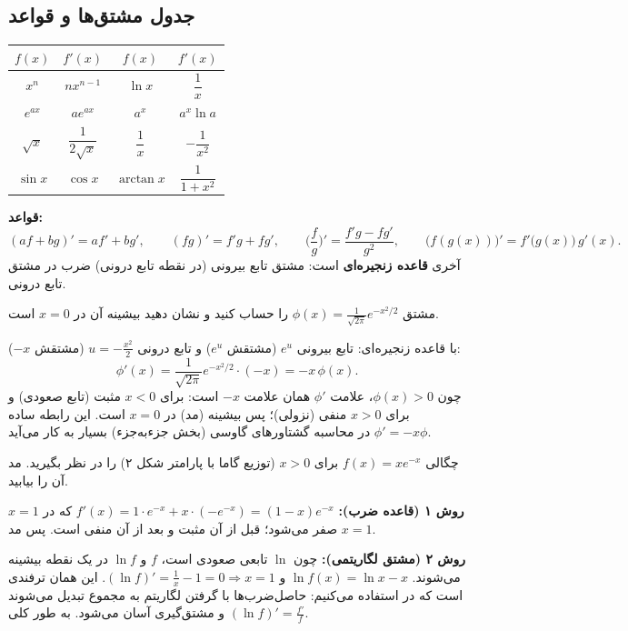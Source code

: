 \subsection{جدول مشتق‌ها و قواعد}
\begin{center}
\renewcommand{\arraystretch}{1.55}
\begin{tabular}{c|c||c|c}
$f(x)$ & $f'(x)$ & $f(x)$ & $f'(x)$\\\hline
$x^n$ & $nx^{n-1}$ & $\ln x$ & $\dfrac1x$\\
$e^{ax}$ & $ae^{ax}$ & $a^x$ & $a^x\ln a$\\
$\sqrt x$ & $\dfrac{1}{2\sqrt x}$ & $\dfrac1x$ & $-\dfrac1{x^2}$\\
$\sin x$ & $\cos x$ & $\arctan x$ & $\dfrac1{1+x^2}$
\end{tabular}
\end{center}
\textbf{قواعد:}
\[
(af+bg)'=af'+bg',\qquad (fg)'=f'g+fg',\qquad \Big(\frac fg\Big)'=\frac{f'g-fg'}{g^2},\qquad \big(f(g(x))\big)'=f'\big(g(x)\big)\,g'(x).
\]
آخری \textbf{قاعده زنجیره‌ای} است: مشتق تابع بیرونی (در نقطه تابع درونی) ضرب در مشتق تابع درونی.

\begin{example}
مشتق $\phi(x)=\frac{1}{\sqrt{2\pi}}e^{-x^2/2}$ را حساب کنید و نشان دهید بیشینه آن در $x=0$ است.
\begin{solution}
با قاعده زنجیره‌ای: تابع بیرونی $e^u$ (مشتقش $e^u$) و تابع درونی $u=-\frac{x^2}{2}$ (مشتقش $-x$):
\[
\phi'(x)=\frac{1}{\sqrt{2\pi}}e^{-x^2/2}\cdot(-x)=-x\,\phi(x).
\]
چون $\phi(x)>0$، علامت $\phi'$ همان علامت $-x$ است: برای $x<0$ مثبت (تابع صعودی) و برای $x>0$ منفی (نزولی)؛ پس بیشینه (مد) در $x=0$ است. این رابطه ساده $\phi'=-x\phi$ در محاسبه گشتاورهای گاوسی (بخش جزءبه‌جزء) بسیار به کار می‌آید.
\end{solution}
\end{example}

\begin{example}
چگالی $f(x)=xe^{-x}$ برای $x>0$ (توزیع گاما با پارامتر شکل ۲) را در نظر بگیرید. مد آن را بیابید.
\begin{solution}
\textbf{روش ۱ (قاعده ضرب):} $f'(x)=1\cdot e^{-x}+x\cdot(-e^{-x})=(1-x)e^{-x}$ که در $x=1$ صفر می‌شود؛ قبل از آن مثبت و بعد از آن منفی است. پس مد $x=1$.

\textbf{روش ۲ (مشتق لگاریتمی):} چون $\ln$ تابعی صعودی است، $f$ و $\ln f$ در یک نقطه بیشینه می‌شوند. $\ln f(x)=\ln x-x$ و $(\ln f)'=\frac1x-1=0\Rightarrow x=1$. این همان ترفندی است که در  استفاده می‌کنیم: حاصل‌ضرب‌ها با گرفتن لگاریتم به مجموع تبدیل می‌شوند و مشتق‌گیری آسان می‌شود. به طور کلی $(\ln f)'=\frac{f'}{f}$.
\end{solution}
\end{example}

